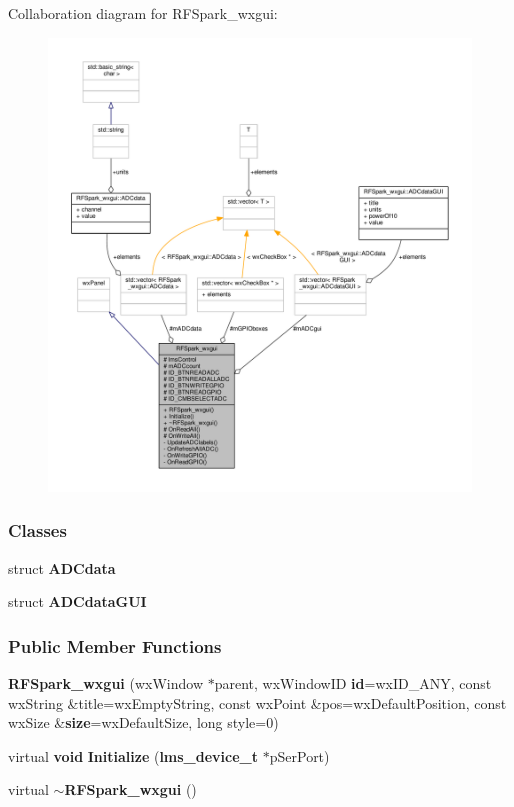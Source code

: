 Collaboration diagram for R\+F\+Spark\+\_\+wxgui\+:
\nopagebreak
\begin{figure}[H]
\begin{center}
\leavevmode
\includegraphics[width=350pt]{db/d50/classRFSpark__wxgui__coll__graph}
\end{center}
\end{figure}
\subsubsection*{Classes}
\begin{DoxyCompactItemize}
\item 
struct {\bf A\+D\+Cdata}
\item 
struct {\bf A\+D\+Cdata\+G\+UI}
\end{DoxyCompactItemize}
\subsubsection*{Public Member Functions}
\begin{DoxyCompactItemize}
\item 
{\bf R\+F\+Spark\+\_\+wxgui} (wx\+Window $\ast$parent, wx\+Window\+ID {\bf id}=wx\+I\+D\+\_\+\+A\+NY, const wx\+String \&title=wx\+Empty\+String, const wx\+Point \&pos=wx\+Default\+Position, const wx\+Size \&{\bf size}=wx\+Default\+Size, long style=0)
\item 
virtual {\bf void} {\bf Initialize} ({\bf lms\+\_\+device\+\_\+t} $\ast$p\+Ser\+Port)
\item 
virtual {\bf $\sim$\+R\+F\+Spark\+\_\+wxgui} ()
\end{DoxyCompactItemize}
